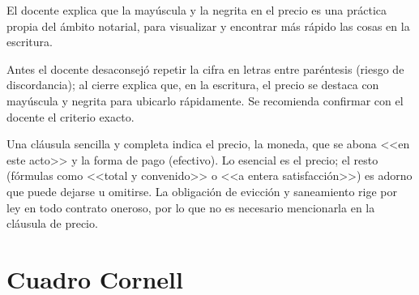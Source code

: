 \documentclass[12pt,oneside]{book}
\begin{document}
El docente explica que la may\'uscula y la negrita en el precio es una pr\'actica propia del \'ambito notarial, para visualizar y encontrar m\'as r\'apido las cosas en la escritura.

\begin{note}
Antes el docente desaconsej\'o repetir la cifra en letras entre par\'entesis (riesgo de discordancia); al cierre explica que, en la escritura, el precio se destaca con may\'uscula y negrita para ubicarlo r\'apidamente. Se recomienda confirmar con el docente el criterio exacto.
\end{note}


\begin{important}
Una cl\'ausula sencilla y completa indica el precio, la moneda, que se abona <<en este acto>> y la forma de pago (efectivo). Lo esencial es el precio; el resto (f\'ormulas como <<total y convenido>> o <<a entera satisfacci\'on>>) es adorno que puede dejarse u omitirse. La obligaci\'on de evicci\'on y saneamiento rige por ley en todo contrato oneroso, por lo que no es necesario mencionarla en la cl\'ausula de precio.
\end{important}

\section{Cuadro Cornell}
\end{document}
